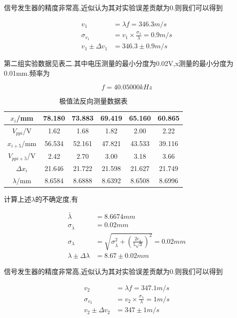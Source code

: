 \documentclass[a4paper,10pt,notitlepage]{article}
\begin{document}
	信号发生器的精度非常高,近似认为其对实验误差贡献为0.则我们可以得到 
	
\begin{align}
	v_1 &= \lambda f = 346.3 m/s \\
	\sigma_{v_1} &= v_1 \times \frac{\sigma_{\lambda}}{\lambda} = 0.9 m/s \\
	v_1 \pm \Delta v_1 &= 346.3 \pm 0.9 m/s
\end{align}

	第二组实验数据见表二.其中电压测量的最小分度为0.02V,x测量的最小分度为0.01mm.频率为
	
\begin{equation}
	f = 40.05000 kHz
\end{equation}

\begin{table}[htbp]
\centering

	\begin{tabular}{|c|c|c|c|c|c|}
	\hline
	$x_{i}$/mm & 78.180 & 73.883 & 69.419 & 65.160 & 60.865 \\
	\hline
	$V_{ppi}$/V & 1.62 & 1.68 & 1.82 & 2.00 & 2.22 \\
	\hline
	$x_{i+5}$/mm & 56.534 & 52.161 & 47.821 & 43.533 & 39.116 \\
	\hline
	$V_{pp i+5}$/V & 2.42 & 2.70 & 3.00 & 3.18 & 3.66 \\
	\hline
	$\Delta x_i$ & 21.646 & 21.722 & 21.598 & 21.627 & 21.749 \\
	\hline
	$\lambda$/mm & 8.6584 & 8.6888 & 8.6392 & 8.6508 & 8.6996 \\
	\hline
	\end{tabular}
	\caption{极值法反向测量数据表}

\end{table}

	计算上述$\lambda$的不确定度,有 
	
\begin{align}
	\bar{\lambda} &= 8.6674mm \\
	\sigma_{\bar{\lambda}} &= 0.02 mm \\
	\sigma_\lambda &= \sqrt{\sigma_{\bar{\lambda}} ^ 2 + (\frac{2e_x}{5\sqrt{3}})^2}  = 0.02mm \\
	\lambda \pm \Delta \lambda &= 8.67 \pm 0.02 mm
\end{align}

	信号发生器的精度非常高,近似认为其对实验误差贡献为0.则我们可以得到 
	
\begin{align}
	v_2 &= \lambda f = 347.1 m/s \\
	\sigma_{v_2} &= v_2 \times \frac{\sigma_{\lambda}}{\lambda} = 1 m/s \\
	v_2 \pm \Delta v_2 &= 347 \pm 1 m/s
\end{align}
\end{document}
